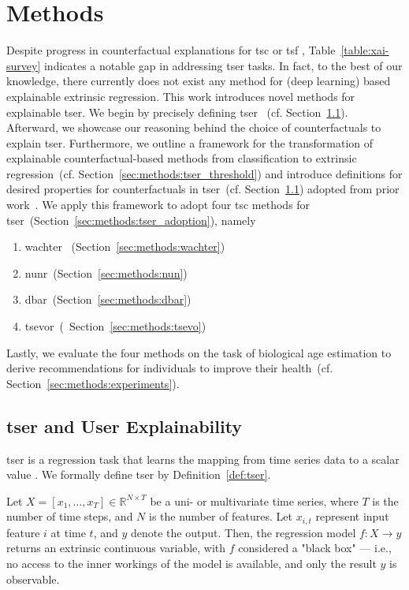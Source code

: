 \section{Methods}
Despite progress in counterfactual explanations for \gls{tsc} or \gls{tsf} \cite{theissler_explainable_2022, rojat_explainable_2021}, Table~\ref{table:xai-survey} indicates a notable gap in addressing \gls{tser} tasks. In fact, to the best of our knowledge, there currently does not exist any method for (deep learning) based explainable extrinsic regression. This work introduces novel methods for explainable \gls{tser}. 
We begin by precisely defining \gls{tser} ~(cf. Section~\ref{sec:methods:tser}). 
Afterward, we showcase our reasoning behind the choice of counterfactuals to explain \gls{tser}.
Furthermore, we outline a framework for the transformation of explainable counterfactual-based methods from classification to extrinsic regression~(cf. Section~\ref{sec:methods:tser_threshold}) and introduce definitions for desired properties for counterfactuals in \gls{tser}~(cf. Section~\ref{sec:methods:tser}) adopted from prior work~\cite{delaney_instance-based_2021}. We apply this framework to adopt four \gls{tsc} methods for \gls{tser}~(Section~\ref{sec:methods:tser_adoption}), namely 
\begin{enumerate}
    \item \gls{wachter} ~(Section~\ref{sec:methods:wachter})
    \item \gls{nunr}~(Section~\ref{sec:methods:nun})
    \item  \gls{dbar}~(Section~\ref{sec:methods:dbar})
    \item \gls{tsevor}~(~Section~\ref{sec:methods:tsevo})
\end{enumerate}
Lastly, we evaluate the four methods on the task of biological age estimation to derive recommendations for individuals to improve their health~(cf. Section~\ref{sec:methods:experiments}).


\label{sec:methods}
\subsection{\gls{tser} and User Explainability}
\label{sec:methods:tser}

\gls{tser} is a regression task that learns the mapping from time series data to a scalar value \cite{tan_time_2021}. We formally define \gls{tser} by Definition~\ref{def:tser}.
\begin{definition}
\label{def:tser}
Let $X=\left[x_{1}, \ldots, x_{T}\right] \in \mathbb{R}^{N \times T}$ be a uni- or multivariate time series, where $T$ is the number of time steps, and $N$ is the number of features. Let $x_{i,t}$ represent input feature $i$ at time $t$, and $y$ denote the output. Then, the regression model $f : X \rightarrow y$ returns an extrinsic continuous variable, with $f$ considered a "black box" — i.e., no access to the inner workings of the model is available, and only the result $y$ is observable.
\end{definition}

